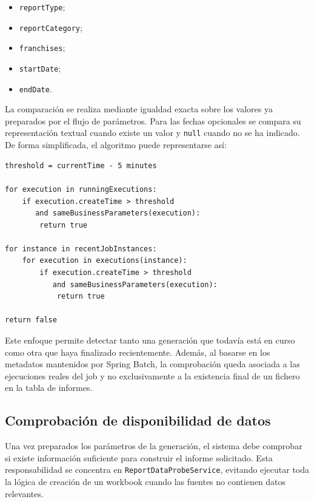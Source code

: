 \documentclass[11pt,a4paper,titlepage,oneside]{report}
\begin{document}
\begin{itemize}

  \item \texttt{reportType};
  \item \texttt{reportCategory};
  \item \texttt{franchises};
  \item \texttt{startDate};
  \item \texttt{endDate}.

\end{itemize}

La comparación se realiza mediante igualdad exacta sobre los valores ya
preparados por el flujo de parámetros. Para las fechas opcionales se compara
su representación textual cuando existe un valor y \texttt{null} cuando no se
ha indicado. \\

De forma simplificada, el algoritmo puede representarse así:

\begin{lstlisting}[caption={Pseudocódigo del control de duplicidad}]
threshold = currentTime - 5 minutes

for execution in runningExecutions:
    if execution.createTime > threshold
       and sameBusinessParameters(execution):
        return true

for instance in recentJobInstances:
    for execution in executions(instance):
        if execution.createTime > threshold
           and sameBusinessParameters(execution):
            return true

return false
\end{lstlisting}

Este enfoque permite detectar tanto una generación que todavía está en curso
como otra que haya finalizado recientemente. Además, al basarse en los
metadatos mantenidos por Spring Batch, la comprobación queda asociada a las
ejecuciones reales del job y no exclusivamente a la existencia final de un
fichero en la tabla de informes.

\subsection{Comprobación de disponibilidad de datos}

Una vez preparados los parámetros de la generación, el sistema debe comprobar
si existe información suficiente para construir el informe solicitado. Esta
responsabilidad se concentra en \texttt{ReportDataProbeService}, evitando
ejecutar toda la lógica de creación de un workbook cuando las fuentes no
contienen datos relevantes. \\
\end{document}
